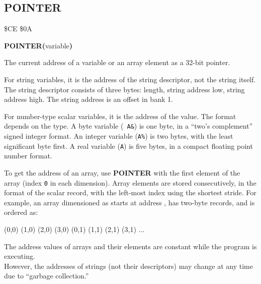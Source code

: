 
\newpage
\subsection{POINTER}
\begin{description}[leftmargin=2cm,style=nextline]
\item [Token:] \$CE \$0A
\item [Format:] {\bf POINTER(}variable{\bf)}
\item [Returns:]  The current address of a variable
                or an array element as a 32-bit pointer.

                For string variables, it is the address of the string
                descriptor, not the string itself. The string descriptor
                consists of three bytes: length, string address low, string
                address high. The string address is an offset in bank 1.

                For number-type scalar variables, it is the address of the
                value. The format depends on the type. A byte variable ({\tt
                A\&}) is one byte, in a ``two's complement'' signed integer
                format. An integer variable ({\tt A\%}) is two bytes, with the
                least significant byte first. A real variable ({\tt A}) is
                five bytes, in a compact floating point number format.

                To get the address of an array, use {\bf POINTER} with the
                first element of the array (index {\tt 0} in each dimension).
                Array elements are stored consecutively, in the format of the
                scalar record, with the left-most index using the shortest
                stride. For example, an array dimensioned as  starts at address , has
                two-byte records, and is ordered as:

                (0,0)  (1,0)  (2,0)  (3,0)  (0,1)  (1,1)  (2,1)  (3,1) ...

\item [Remarks:] The address values of arrays and their elements
                 are constant while the program is executing. \\
                 However, the addresses of strings (not their descriptors)
                 may change at any time due to
                 ``garbage collection.''


\end{description}
